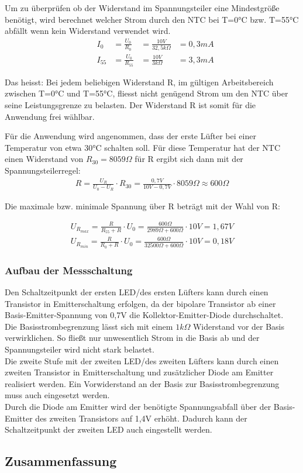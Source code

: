Um zu überprüfen ob der Widerstand im Spannungsteiler eine Mindestgröße benötigt, wird berechnet welcher Strom durch den NTC bei T=0°C bzw. T=55°C abfällt wenn kein Widerstand verwendet wird.\\

\begin{align}
&I_0 &=\frac{U_0}{R_0}&=\frac{10V}{32,5k\Omega}&=0,3mA
\\&I_{55} &=\frac{U_0}{R_{55}}&=\frac{10V}{3k\Omega}&=3,3mA
\end{align}

Das heisst: Bei jedem beliebigen Widerstand R, im gültigen Arbeitsbereich zwischen T=0°C und T=55°C, fliesst nicht genügend Strom um den NTC über seine Leistungsgrenze zu belasten.
Der Widerstand R ist somit für die Anwendung frei wählbar.

Für die Anwendung wird angenommen, dass der erste Lüfter bei einer Temperatur von etwa 30°C schalten soll. Für diese Temperatur hat der NTC einen Widerstand von \(R_{30} = 8059 \Omega\) für R ergibt sich dann mit der Spannungsteilerregel:
\begin{align}
R=\frac{U_R}{U_0-U_R}\cdot R_{30} = \frac{0,7V}{10V-0,7V}\cdot 8059\Omega \approx 600\Omega
\end{align}

Die maximale bzw. minimale Spannung über R beträgt mit der Wahl von R:

\begin{align}
U_{R_{max}} = \frac{R}{R_{55}+R}\cdot U_0 = \frac{600\Omega}{2989\Omega + 600\Omega}\cdot 10V = 1,67V\\
U_{R_{min}} = \frac{R}{R_{0}+R}\cdot U_0 = \frac{600\Omega}{32500\Omega + 600\Omega}\cdot 10V = 0,18V
\end{align}

\subsubsection{Aufbau der Messschaltung}

Den Schaltzeitpunkt der ersten LED/des ersten Lüfters kann durch einen Transistor in Emitterschaltung erfolgen, da der bipolare Transistor ab einer Basis-Emitter-Spannung von 0,7V die Kollektor-Emitter-Diode durchschaltet.\\
Die Basisstrombegrenzung lässt sich mit einem \(1k\Omega\) Widerstand vor der Basis verwirklichen. So fließt nur unwesentlich Strom in die Basis ab und der Spannungsteiler wird nicht stark belastet.\\

Die zweite Stufe mit der zweiten LED/des zweiten Lüfters kann durch einen zweiten Transistor in Emitterschaltung und zusätzlicher Diode am Emitter realisiert werden. Ein Vorwiderstand an der Basis zur Basisstrombegrenzung muss auch eingesetzt werden.\\
Durch die Diode am Emitter wird der benötigte Spannungsabfall über der Basis-Emitter des zweiten Transistors auf 1,4V erhöht. Dadurch kann der Schaltzeitpunkt der zweiten LED auch eingestellt werden. 

\subsection{Zusammenfassung}